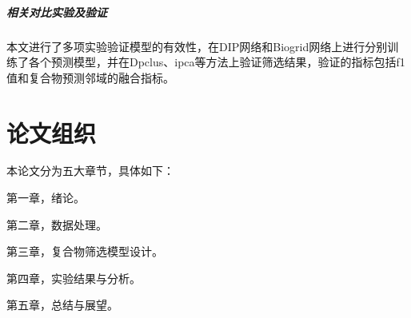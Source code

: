 \subparagraph*{相关对比实验及验证}

本文进行了多项实验验证模型的有效性，在DIP网络和Biogrid网络上进行分别训练了各个预测模型，并在Dpclus、ipca等方法上验证筛选结果，验证的指标包括f1值和复合物预测邻域的融合指标。

\section{论文组织}
\label{section:intro:organization}

本论文分为五大章节，具体如下：

第一章，绪论。

第二章，数据处理。

第三章，复合物筛选模型设计。

第四章，实验结果与分析。

第五章，总结与展望。